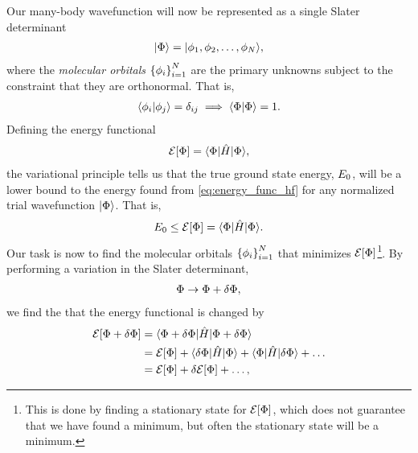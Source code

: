         Our many-body wavefunction will now be represented as a single Slater
        determinant
        \begin{align}
            | \Phi \rangle = | \phi_1, \phi_2, \dots, \phi_N \rangle,
        \end{align}
        where the \emph{molecular orbitals} $\left\{ \phi_i \right\}_{i = 1}^{N}$ are the
        primary unknowns subject to the constraint that they are orthonormal.
        That is,
        \begin{align}
            \langle \phi_i | \phi_j \rangle = \delta_{ij}
            \implies \langle \Phi | \Phi \rangle = 1.
        \end{align}
        Defining the energy functional
        \begin{align}
            \mathcal{E}[\Phi]
            = \langle \Phi |\hat{H}| \Phi \rangle,
            \label{eq:energy_func_hf}
        \end{align}
        the variational principle tells us that the true ground state energy,
        $E_0$, will be a lower bound to the energy found from
        \autoref{eq:energy_func_hf} for any normalized trial wavefunction
        $| \Phi \rangle$. That is,
        \begin{align}
            E_0
            \leq \mathcal{E}[\Phi] = \langle \Phi |\hat{H}| \Phi \rangle.
        \end{align}
        Our task is now to find the molecular orbitals $\left\{ \phi_i \right\}_{i =
        1}^{N}$ that minimizes $\mathcal{E}[\Phi]$\footnote{This is done by
        finding a stationary state for $\mathcal{E}[\Phi]$, which does not
        guarantee that we have found a minimum, but often the stationary state
        will be a minimum.}. By performing a variation in the Slater
        determinant,
        \begin{align}
            \Phi \to \Phi + \delta\Phi,
        \end{align}
        we find the that the energy functional is changed by
        \begin{align}
            \mathcal{E}[\Phi + \delta\Phi]
            &=
            \langle \Phi + \delta\Phi |\hat{H}| \Phi + \delta\Phi \rangle
            \\
            &= \mathcal{E}[\Phi]
            + \langle \delta\Phi |\hat{H}| \Phi \rangle + \langle \Phi |\hat{H}| \delta\Phi \rangle
            + \dots
            \\
            &= \mathcal{E}[\Phi] + \delta\mathcal{E}[\Phi]
            + \dots,
        \end{align}
